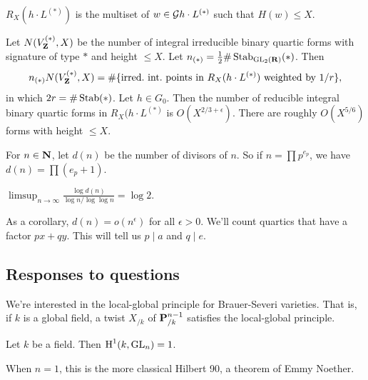 \begin{definition}
$R_X(h\cdot L^{(\ast)})$ is the multiset of $w\in \mathcal{G} h\cdot L^{(\ast)}$ such 
that $H(w)\leqslant X$. 
\end{definition}

Let $N(V_{\mathbf{Z}}^{(\ast)},X)$ be the number of integral irreducible binary quartic 
forms with signature of type $\ast$ and height $\leqslant X$. Let 
$n_{(\ast)}=\frac 1 2\#\operatorname{Stab}_{\operatorname{GL}_2(\mathbf{R})}(\ast)$. Then 
\[
  n_{(\ast)} N(V_{\mathbf{Z}}^{(\ast)},X) = \#\{\text{irred.~int.~points in }R_X(h\cdot L^{(\ast)})\text{ weighted by $1/r$}\},
\]
in which $2 r=\#\operatorname{Stab}(\ast)$. Let $h\in G_0$. Then the number of 
reducible integral binary quartic forms in $R_X(h\cdot L^{(\ast)}$ is 
$O(X^{2/3+\epsilon})$. There are roughly $O(X^{5/6})$ forms with height 
$\leqslant X$. 

For $n\in \mathbf{N}$, let $d(n)$ be the number of divisors of $n$. So if 
$n=\prod p^{e_p}$, we have $d(n)=\prod (e_p+1)$. 

\begin{lemma}
$\limsup_{n\to \infty} \frac{\log d(n)}{\log n/\log\log n} = \log 2$. 
\end{lemma}

As a corollary, $d(n)=o(n^\epsilon)$ for all $\epsilon>0$. We'll count 
quartics that have a factor $p x+q y$. This will tell us $p\mid a$ and 
$q\mid e$. 





\subsection{Responses to questions}

We're interested in the local-global principle for Brauer-Severi varieties. 
That is, if $k$ is a global field, a twist $X_{/k}$ of $\mathbf{P}^{n-1}_{/k}$ 
satisfies the local-global principle. 

\begin{theorem}[Hilbert 90]
Let $k$ be a field. Then $\operatorname{H}^1(k,\operatorname{GL}_n)=1$. 
\end{theorem}

When $n=1$, this is the more classical Hilbert 90, a theorem of Emmy 
Noether. 


